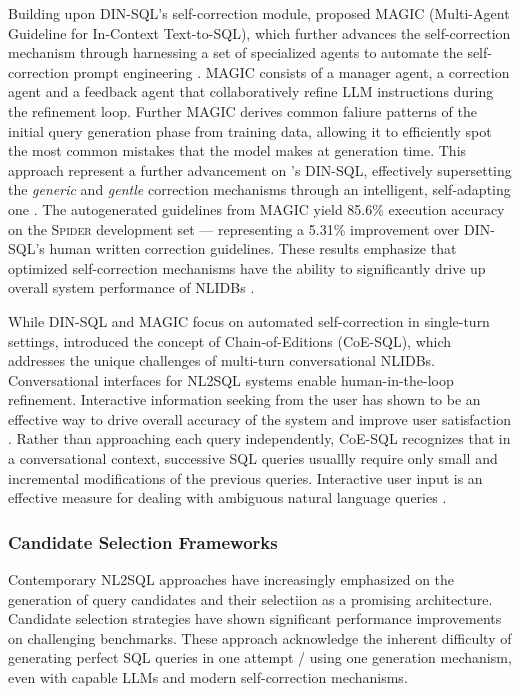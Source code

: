 \documentclass{article}
\begin{document}
Building upon DIN-SQL's self-correction module, \cite{MAGIC} proposed MAGIC (Multi-Agent Guideline for In-Context Text-to-SQL),
which further advances the self-correction mechanism through harnessing a set of specialized agents to automate the self-correction
prompt engineering \citep{MAGIC}. MAGIC consists of a manager agent, a correction agent and a feedback agent that collaboratively
refine LLM instructions during the refinement loop. Further MAGIC derives common faliure patterns of the initial query generation
phase from training data, allowing it to efficiently spot the most common mistakes that the model makes at generation time. This
approach represent a further advancement on \citeauthor{DINSQL}'s DIN-SQL, effectively supersetting the \textit{generic} and
\textit{gentle} correction mechanisms through an intelligent, self-adapting one \citep{MAGIC}. The autogenerated guidelines from
MAGIC yield 85.6\% execution accuracy on the \textsc{Spider} development set — representing a 5.31\% improvement over DIN-SQL's
human written correction guidelines. These results emphasize that optimized self-correction mechanisms have the ability to
significantly drive up overall system performance of NLIDBs \citep{MAGIC}.

While DIN-SQL and MAGIC focus on automated self-correction in single-turn settings, \cite{CoE-SQL} introduced the concept of
Chain-of-Editions (CoE-SQL), which addresses the unique challenges of multi-turn conversational NLIDBs. Conversational interfaces
for NL2SQL systems enable human-in-the-loop refinement. Interactive information seeking from the user has shown to be an
effective way to drive overall accuracy of the system and improve user satisfaction \citep{NALIR}. Rather than approaching
each query independently, CoE-SQL recognizes that in a conversational context, successive SQL queries usuallly require only
small and incremental modifications of the previous queries. Interactive user input is an effective measure for dealing with
ambiguous natural language queries \citep{CoE-SQL, UnnaturalQueryLanguage, NALIR}.

\subsubsection{Candidate Selection Frameworks}

Contemporary NL2SQL approaches have increasingly emphasized on the generation of query candidates and their selectiion as a
promising architecture. Candidate selection strategies have shown significant performance improvements on challenging benchmarks.
These approach acknowledge the inherent difficulty of generating perfect SQL queries in one attempt / using one generation
mechanism, even with capable LLMs and modern self-correction mechanisms.
\end{document}

